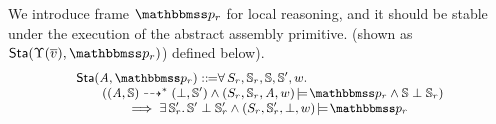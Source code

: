 We introduce frame $\relastP_r$ for local reasoning, 
and it should be stable under the execution 
of the abstract assembly primitive.  
(shown as $\Sta(\hprim(\args{\val}), \relastP_r)$)
defined below). 
\[
    \small
    \begin{array}{l}
        \Sta(\primcom, \relastP_r) 
        \define 
        \forall \, \state_r, \hpstate_r, \hpstate, 
        \hpstate', \word. \\
        \qquad
        (\primTransMulti{(\primcom, \hpstate)}{*}{(\primdone, \hpstate')}
        \land \asrtmodel{(\state_r, \hpstate_r, \primcom, \word)}{\relastP_r}
        \land \hpstate\perp\hpstate_r) \\
        \qquad\qquad 
        \implies
        \exists\, \hpstate_r'. \, 
        \hpstate'\perp\hpstate_r' \land 
        \asrtmodel{(\state_r, \hpstate_r', \primdone, \word)}
            {\relastP_r}
    \end{array}
\]

